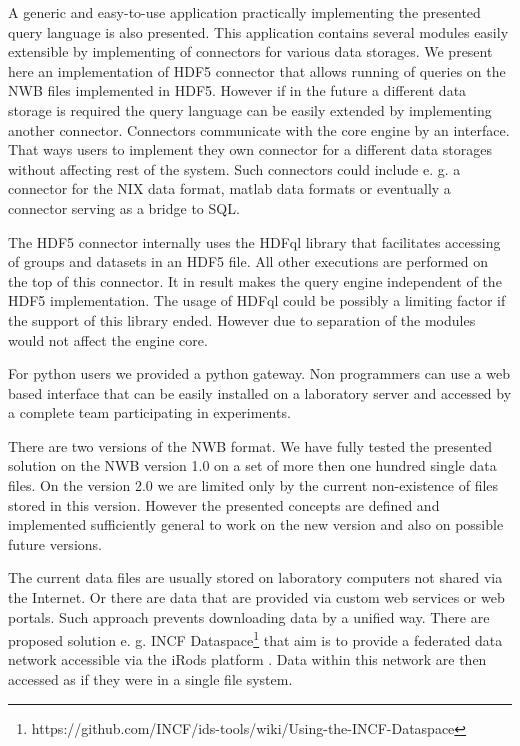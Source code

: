 \documentclass[utf8]{frontiersSCNS} %
\begin{document}
A generic and easy-to-use application practically implementing the presented query language is also presented. This application contains several modules easily extensible by implementing of connectors for various data storages. We present here an implementation of HDF5 connector that allows running of queries on the NWB files implemented in HDF5. However if in the future a different data storage is required the query language can be easily extended by implementing another connector. Connectors communicate with the core engine by an interface. That ways users to implement they own connector for a different data storages without affecting rest of the system. Such connectors could include e. g. a connector for the NIX data format, matlab data formats or eventually a connector serving as a bridge to SQL.


The HDF5 connector internally uses the HDFql library that facilitates accessing of groups and datasets in an HDF5 file. All other executions are performed on the top of this connector. It in result makes the query engine independent of the HDF5 implementation. The usage of HDFql could be possibly a limiting factor if the support of this library ended. However due to  separation of the modules would not affect the engine core. 

For python users we provided a python gateway. Non programmers can use a web based interface that can be easily installed on a laboratory server and accessed by a complete team participating in experiments.

There are two versions of the NWB format. We have fully tested the presented solution on the NWB version 1.0 on a set of more then one hundred single data files. On the version 2.0 we are limited only by the current non-existence of files stored in this version. However the presented concepts are defined and implemented sufficiently general to work on the new version and also on possible future versions.

The current data files are usually stored on laboratory computers not shared via the Internet. Or there are data that are provided via custom web services or web portals. Such approach prevents downloading data by a unified way. There are proposed solution e. g. INCF Dataspace\footnote{https://github.com/INCF/ids-tools/wiki/Using-the-INCF-Dataspace} that aim is to provide a federated data network accessible via the iRods platform \citep{rajasekar2010irods}. Data within this network are then accessed as if they were in a single file system. 
\end{document}
